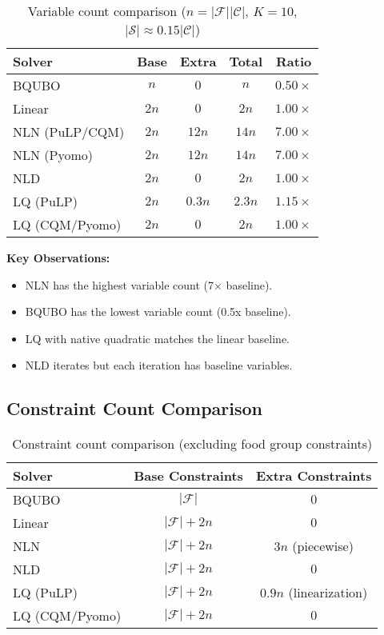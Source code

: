 \documentclass[11pt,a4paper]{article}
\begin{document}
\begin{table}[h]
\centering
\caption{Variable count comparison ($n = |\mathcal{F}||\mathcal{C}|$, $K=10$, $|\mathcal{S}| \approx 0.15|\mathcal{C}|$)}
\label{tab:variables}
\begin{tabular}{lcccc}
\toprule
\textbf{Solver} & \textbf{Base} & \textbf{Extra} & \textbf{Total} & \textbf{Ratio} \\
\midrule
BQUBO & $n$ & $0$ & $n$ & $0.50\times$ \\
Linear & $2n$ & $0$ & $2n$ & $1.00\times$ \\
NLN (PuLP/CQM) & $2n$ & $12n$ & $14n$ & $7.00\times$ \\
NLN (Pyomo) & $2n$ & $12n$ & $14n$ & $7.00\times$ \\
NLD & $2n$ & $0$ & $2n$ & $1.00\times$ \\
LQ (PuLP) & $2n$ & $0.3n$ & $2.3n$ & $1.15\times$ \\
LQ (CQM/Pyomo) & $2n$ & $0$ & $2n$ & $1.00\times$ \\
\bottomrule
\end{tabular}
\end{table}

\textbf{Key Observations:}
\begin{itemize}
    \item NLN has the highest variable count (7× baseline).
    \item BQUBO has the lowest variable count (0.5x baseline).
    \item LQ with native quadratic matches the linear baseline.
    \item NLD iterates but each iteration has baseline variables.
\end{itemize}

\subsection{Constraint Count Comparison}

\begin{table}[h]
\centering
\caption{Constraint count comparison (excluding food group constraints)}
\label{tab:constraints}
\begin{tabular}{lcc}
\toprule
\textbf{Solver} & \textbf{Base Constraints} & \textbf{Extra Constraints} \\
\midrule
BQUBO & $|\mathcal{F}|$ & $0$ \\
Linear & $|\mathcal{F}| + 2n$ & $0$ \\
NLN & $|\mathcal{F}| + 2n$ & $3n$ (piecewise) \\
NLD & $|\mathcal{F}| + 2n$ & $0$ \\
LQ (PuLP) & $|\mathcal{F}| + 2n$ & $0.9n$ (linearization) \\
LQ (CQM/Pyomo) & $|\mathcal{F}| + 2n$ & $0$ \\
\bottomrule
\end{tabular}
\end{table}
\end{document}

